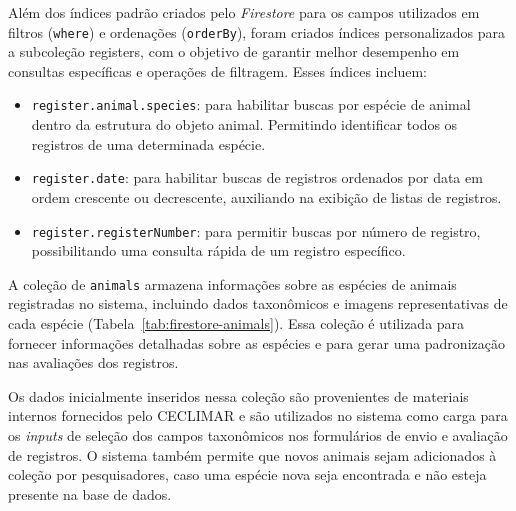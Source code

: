Além dos índices padrão criados pelo \textit{Firestore} para os campos utilizados em filtros (\texttt{where}) e ordenações (\texttt{orderBy}), foram criados índices personalizados para a subcoleção registers, com o objetivo de garantir melhor desempenho em consultas específicas e operações de filtragem. Esses índices incluem:

\begin{itemize}
    \item \texttt{register.animal.species}: para habilitar buscas por espécie de animal dentro da 
    estrutura do objeto animal. Permitindo identificar todos os registros de uma determinada
    espécie.
    \item \texttt{register.date}: para habilitar buscas de registros ordenados por data em ordem 
    crescente ou decrescente, auxiliando na exibição de listas de registros.
    \item \texttt{register.registerNumber}: para permitir buscas por número de registro, possibilitando 
    uma consulta rápida de um registro específico.
\end{itemize}

A coleção de \texttt{animals} armazena informações sobre as espécies de animais registradas no sistema, incluindo dados taxonômicos e imagens representativas de cada espécie (Tabela~\ref{tab:firestore-animals}). Essa coleção é utilizada para fornecer informações detalhadas sobre as espécies e para gerar uma padronização nas avaliações dos registros.

Os dados inicialmente inseridos nessa coleção são provenientes de materiais internos fornecidos pelo CECLIMAR e são utilizados no sistema como carga para os \textit{inputs} de seleção dos campos taxonômicos nos formulários de envio e avaliação de registros. O sistema também permite que novos animais sejam adicionados à coleção por pesquisadores, caso uma espécie nova seja encontrada e não esteja presente na base de dados. 

